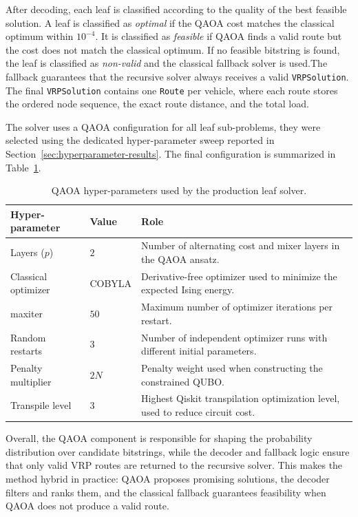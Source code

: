 \documentclass[a4paper]{report}
\begin{document}
{\begin{itemize}
\begin{itemize}
After decoding, each leaf is classified according to the quality of the
best feasible solution. A leaf is classified as \emph{optimal} if the
QAOA cost matches the classical optimum within $10^{-4}$. It is
classified as \emph{feasible} if QAOA finds a valid route but the cost
does not match the classical optimum. If no feasible bitstring is found, the leaf is classified as \emph{non-valid} and the classical fallback solver is
used.The fallback guarantees that the recursive solver always receives a
valid \texttt{VRPSolution}. The final \texttt{VRPSolution} contains one
\texttt{Route} per vehicle, where each route stores the ordered node
sequence, the exact route distance, and the total load.


The solver uses a  QAOA configuration for all leaf
sub-problems, they were selected using the dedicated hyper-parameter
sweep reported in Section~\ref{sec:hyperparameter-results}. The final
configuration is summarized in Table~\ref{tab:qaoa-hyperparameters}.

\begin{table}[!ht]
\centering
\caption{QAOA hyper-parameters used by the production leaf solver.}
\label{tab:qaoa-hyperparameters}
\renewcommand{\arraystretch}{1.25}
\begin{tabular}{@{}p{3.2cm}p{3.5cm}p{7.5cm}@{}}
\toprule
\textbf{Hyper-parameter} & \textbf{Value} & \textbf{Role} \\
\midrule
Layers ($p$)
  & $2$
  & Number of alternating cost and mixer layers in the QAOA ansatz. \\
Classical optimizer
  & COBYLA
  & Derivative-free optimizer used to minimize the expected Ising energy. \\
{maxiter}
  & $50$
  & Maximum number of optimizer iterations per restart. \\
Random restarts
  & $3$
  & Number of independent optimizer runs with different initial parameters. \\
Penalty multiplier
  & $2N$
  & Penalty weight used when constructing the constrained QUBO. \\

Transpile level
  & $3$
  & Highest Qiskit transpilation optimization level, used to reduce circuit cost. \\
\bottomrule
\end{tabular}
\end{table}

Overall, the QAOA component is responsible for shaping the probability
distribution over candidate bitstrings, while the decoder and fallback
logic ensure that only valid VRP routes are returned to the recursive
solver. This makes the method hybrid in practice: QAOA proposes
promising solutions, the decoder filters and ranks them, and the
classical fallback guarantees feasibility when QAOA does not produce a
valid route.










\end{itemize}
\end{itemize}}
\end{document}
